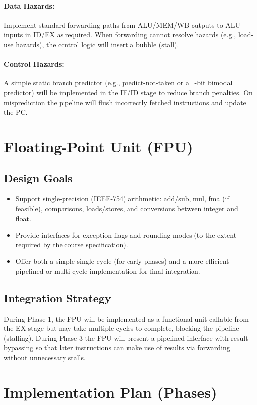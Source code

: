 \documentclass[11pt,a4paper]{article}
\begin{document}
\paragraph{Data Hazards:} Implement standard forwarding paths from ALU/MEM/WB outputs to ALU inputs in ID/EX as required. When forwarding cannot resolve hazards (e.g., load-use hazards), the control logic will insert a bubble (stall).

\paragraph{Control Hazards:} A simple static branch predictor (e.g., predict-not-taken or a 1-bit bimodal predictor) will be implemented in the IF/ID stage to reduce branch penalties. On misprediction the pipeline will flush incorrectly fetched instructions and update the PC.

\section{Floating-Point Unit (FPU)}
\subsection{Design Goals}
\begin{itemize}
\item Support single-precision (IEEE-754) arithmetic: add/sub, mul, fma (if feasible), comparisons, loads/stores, and conversions between integer and float.
\item Provide interfaces for exception flags and rounding modes (to the extent required by the course specification).
\item Offer both a simple single-cycle (for early phases) and a more efficient pipelined or multi-cycle implementation for final integration.
\end{itemize}

\subsection{Integration Strategy}
During Phase 1, the FPU will be implemented as a functional unit callable from the EX stage but may take multiple cycles to complete, blocking the pipeline (stalling). During Phase 3 the FPU will present a pipelined interface with result-bypassing so that later instructions can make use of results via forwarding without unnecessary stalls.

\section{Implementation Plan (Phases)}
\end{document}
